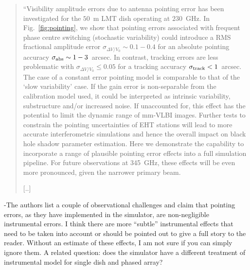 \begin{quotation}
``Visibility amplitude errors due to antenna pointing error has been investigated for the $50$~m  LMT dish operating at $230$~GHz. In Fig.~\ref{fig:pointing}, we show that pointing errors associated with frequent phase centre switching (stochastic variability) could introduce a RMS fractional amplitude error $\sigma_{\Delta V/V_0} \sim 0.1 - 0.4$ for an absolute pointing accuracy  $\sigma_{\rm abs} \sim 1-3$~arcsec. In contrast, tracking errors are less problematic with $\sigma_{\Delta V/V_0} \le 0.05$ for a tracking accuracy  $\sigma_{\rm track}<1$~arcsec. The case of a constant error pointing model is comparable to that of the `slow variability' case. If the gain error is non-separable from the calibration model used, it could be interpreted as intrinsic variability, substructure and/or increased noise. If unaccounted for, this effect has the potential to limit the dynamic range of mm-VLBI images. Further tests to constrain the pointing uncertainties of EHT stations will lead to more accurate interferometric simulations and hence the overall impact on black hole shadow parameter estimation. Here we demonstrate the capability to incorporate a range of plausible pointing error effects into a full simulation pipeline. For future observations at 345~GHz, these effects will be even more pronounced, given the narrower primary beam.

[..]
\\
\citep{Blecher_2016}
\end{quotation}






-The authors list a couple of observational challenges and claim that pointing errors, as they have implemented in the simulator, are non-negligible instrumental errors. I think there are more “subtle” instrumental effects that need to be taken into account or should be pointed out to give a full story to the reader. Without an estimate of these effects, I am not sure if you can simply ignore them. A related question: does the simulator have a different treatment of instrumental model for single dish and phased array?


